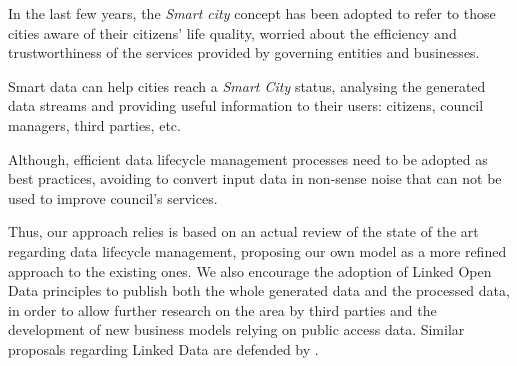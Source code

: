 In the last few years, the \textit{Smart city} concept has been adopted to refer to those cities aware of their citizens' life quality, worried about the efficiency and trustworthiness of the services provided by governing entities and businesses.

Smart data can help cities reach a \textit{Smart City} status, analysing the generated data streams and providing useful information to their users: citizens, council managers, third parties, etc.

Although, efficient data lifecycle management processes need to be adopted as best practices, avoiding to convert input data in non-sense noise that can not be used to improve council's services.

Thus, our approach relies is based on an actual review of the state of the art regarding data lifecycle management, proposing our own model as a more refined approach to the existing ones. We also encourage the adoption of Linked Open Data principles to publish both the whole generated data and the processed data, in order to allow further research on the area by third parties and the development of new business models relying on public access data. Similar proposals regarding Linked Data are defended by \cite{Bizer:2012:MUB:2094114.2094129}.